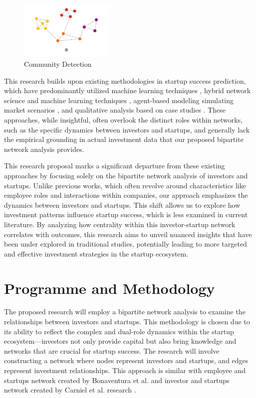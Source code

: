 \documentclass[a4paper,11pt]{article}
\begin{document}
\begin{figure}[h]
\centering
\includegraphics[width=0.4\textwidth]{community.png}
\caption{Community Detection}
\end{figure}

This research builds upon existing methodologies in startup success prediction, which have predominantly utilized machine learning techniques \cite{krishna2016a} \cite{sharchilev2018a}, hybrid network science and machine learning techniques \cite{carniel2023a} \cite{yang2020a}, agent-based modeling simulating market scenarios \cite{lengyel2020a}, and qualitative analysis based on case studies \cite{mccarthy2023a}. These approaches, while insightful, often overlook the distinct roles within networks, such as the specific dynamics between investors and startups, and generally lack the empirical grounding in actual investment data that our proposed bipartite network analysis provides.

This research proposal marks a significant departure from these existing approaches by focusing solely on the bipartite network analysis of investors and startups. Unlike previous works, which often revolve around characteristics like employee roles and interactions within companies, our approach emphasizes the dynamics between investors and startups. This shift allows us to explore how investment patterns influence startup success, which is less examined in current literature. By analyzing how centrality within this investor-startup network correlates with outcomes, this research aims to unveil nuanced insights that have been under explored in traditional studies, potentially leading to more targeted and effective investment strategies in the startup ecosystem.

\section{Programme and Methodology}
The proposed research will employ a bipartite network analysis to examine the relationships between investors and startups. This methodology is chosen due to its ability to reflect the complex and dual-role dynamics within the startup ecosystem—investors not only provide capital but also bring knowledge and networks that are crucial for startup success. The research will involve constructing a network where nodes represent investors and startups, and edges represent investment relationships. This approach is similar with employee and startups network created by Bonaventura et al. \cite{bonaventura2020a} and investor and startups network created by Carniel et al. research \cite{carniel2023a}.
\end{document}
